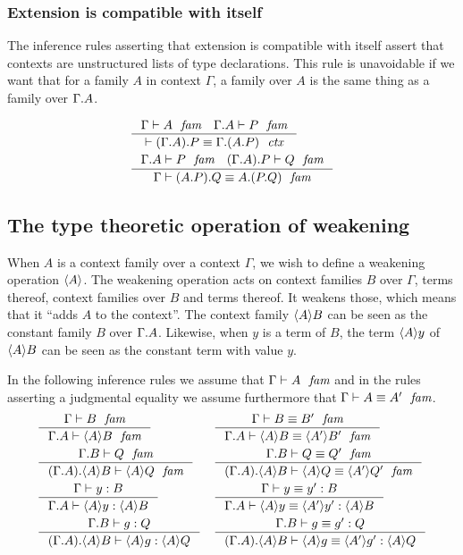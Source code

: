 \subsubsection{Extension is compatible with itself}\label{comp-ee}
The inference rules asserting that extension is compatible with itself assert
that contexts are unstructured lists of type declarations. This rule is
unavoidable if we want that for a family $A$ in context $\Gamma$, a family over
$A$ is the same thing as a family over $\ctxext{\Gamma}{A}$. 

\begin{align}
& \inference
  {\jfam{\Gamma}{A}
   \jfam{{\Gamma}{A}}{P}}
  {\jctxeq{\ctxext{{\Gamma}{A}}{P}}{\ctxext{\Gamma}{{A}{P}}}}\\
& \inference
  {\jfam{{\Gamma}{A}}{P}
   \jfam{{{\Gamma}{A}}{P}}{Q}}
  {\jfameq{\Gamma}{\ctxext{{A}{P}}{Q}}{\ctxext{A}{{P}{Q}}}}
\end{align}

\subsection{The type theoretic operation of weakening}
When $A$ is a context family over a context $\Gamma$, we wish to define a weakening
operation $\ctxwk{A}{}$. The weakening operation acts on context families $B$ 
over $\Gamma$, terms thereof, context families over $B$ and terms thereof.
It weakens those, which means that it ``adds $A$ to the context''. The context
family $\ctxwk{A}{B}$ can be seen as the constant family $B$ over $\ctxext{\Gamma}{A}$.
Likewise, when $y$ is a term of $B$, the term $\ctxwk{A}{y}$ of $\ctxwk{A}{B}$
can be seen as the constant term with value $y$.
 
 In the following inference rules we assume that $\jfam{\Gamma}{A}$ and in the
 rules asserting a judgmental equality we assume furthermore that 
 $\jfameq{\Gamma}{A}{A'}$.
\begin{align}
& \inference
  {\jfam{\Gamma}{B}}
  {\jfam{{\Gamma}{A}}{\ctxwk{A}{B}}}
& & \inference
    {\jfameq{\Gamma}{B}{B'}}
    {\jfameq{{\Gamma}{A}}{\ctxwk{A}{B}}{\ctxwk{A'}{B'}}}\\
& \inference
  {\jfam{{\Gamma}{B}}{Q}}
  {\jfam{{{\Gamma}{A}}{\ctxwk{A}{B}}}{\ctxwk{A}{Q}}}
& & \inference
    {\jfameq{{\Gamma}{B}}{Q}{Q'}}
    {\jfameq{{{\Gamma}{A}}{\ctxwk{A}{B}}}{\ctxwk{A}{Q}}{\ctxwk{A'}{Q'}}}\\
& \inference
  {\jterm{\Gamma}{B}{y}}
  {\jterm{{\Gamma}{A}}{\ctxwk{A}{B}}{\ctxwk{A}{y}}}
& & \inference
    {\jtermeq{\Gamma}{B}{y}{y'}}
    {\jtermeq{{\Gamma}{A}}{\ctxwk{A}{B}}{\ctxwk{A}{y}}{\ctxwk{A'}{y'}}}\\
& \inference
  {\jterm{{\Gamma}{B}}{Q}{g}}
  {\jterm{{{\Gamma}{A}}{\ctxwk{A}{B}}}{\ctxwk{A}{Q}}{\ctxwk{A}{g}}}
& & \inference
    {\jtermeq{{\Gamma}{B}}{Q}{g}{g'}}
    {\jtermeq{{{\Gamma}{A}}{\ctxwk{A}{B}}}{\ctxwk{A}{Q}}{\ctxwk{A}{g}}{\ctxwk{A'}{g'}}}
\end{align}

